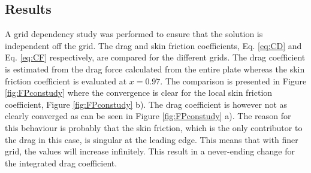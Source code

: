 \subsection{Results}
A grid dependency study was performed to ensure that the solution is independent off the grid. The drag and skin friction coefficients, Eq. \ref{eq:CD} and Eq. \ref{eq:CF} respectively, are compared for the different grids. The drag coefficient is estimated from the drag force calculated from the entire plate whereas the skin friction coefficient is evaluated at $x=0.97$. The comparison is presented in Figure \ref{fig:FPconstudy} where the convergence is clear for the local skin friction coefficient, Figure \ref{fig:FPconstudy} b). The drag coefficient is however not as clearly converged as can be seen in Figure \ref{fig:FPconstudy} a). The reason for this behaviour is probably that the skin friction, which is the only contributor to the drag in this case, is singular at the leading edge. This means that with finer grid, the values will increase infinitely. This result in a never-ending change for the integrated drag coefficient.

